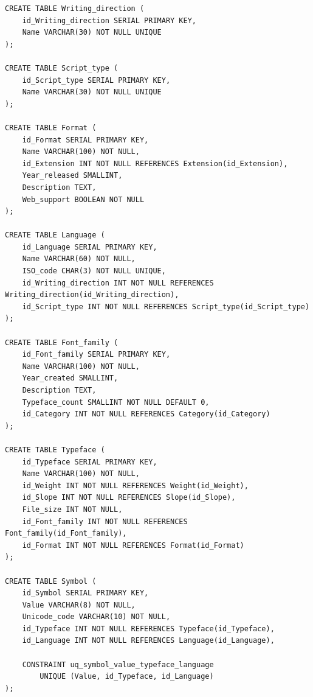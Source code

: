\begin{verbatim}
CREATE TABLE Writing_direction (
    id_Writing_direction SERIAL PRIMARY KEY,
    Name VARCHAR(30) NOT NULL UNIQUE
);

CREATE TABLE Script_type (
    id_Script_type SERIAL PRIMARY KEY,
    Name VARCHAR(30) NOT NULL UNIQUE
);

CREATE TABLE Format (
    id_Format SERIAL PRIMARY KEY,
    Name VARCHAR(100) NOT NULL,
    id_Extension INT NOT NULL REFERENCES Extension(id_Extension),
    Year_released SMALLINT,
    Description TEXT,
    Web_support BOOLEAN NOT NULL
);

CREATE TABLE Language (
    id_Language SERIAL PRIMARY KEY,
    Name VARCHAR(60) NOT NULL,
    ISO_code CHAR(3) NOT NULL UNIQUE,
    id_Writing_direction INT NOT NULL REFERENCES Writing_direction(id_Writing_direction),
    id_Script_type INT NOT NULL REFERENCES Script_type(id_Script_type)
);

CREATE TABLE Font_family (
    id_Font_family SERIAL PRIMARY KEY,
    Name VARCHAR(100) NOT NULL,
    Year_created SMALLINT,
    Description TEXT,
    Typeface_count SMALLINT NOT NULL DEFAULT 0,
    id_Category INT NOT NULL REFERENCES Category(id_Category)
);

CREATE TABLE Typeface (
    id_Typeface SERIAL PRIMARY KEY,
    Name VARCHAR(100) NOT NULL,
    id_Weight INT NOT NULL REFERENCES Weight(id_Weight),
    id_Slope INT NOT NULL REFERENCES Slope(id_Slope),
    File_size INT NOT NULL,
    id_Font_family INT NOT NULL REFERENCES Font_family(id_Font_family),
    id_Format INT NOT NULL REFERENCES Format(id_Format)
);

CREATE TABLE Symbol (
    id_Symbol SERIAL PRIMARY KEY,
    Value VARCHAR(8) NOT NULL,
    Unicode_code VARCHAR(10) NOT NULL,
    id_Typeface INT NOT NULL REFERENCES Typeface(id_Typeface),
    id_Language INT NOT NULL REFERENCES Language(id_Language),

    CONSTRAINT uq_symbol_value_typeface_language
        UNIQUE (Value, id_Typeface, id_Language)
);
\end{verbatim}
